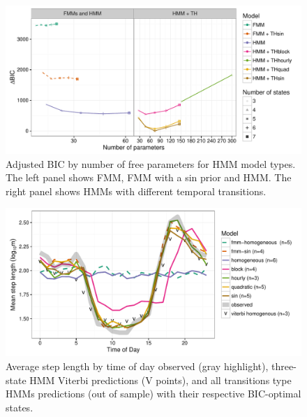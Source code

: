 \documentclass{article}\usepackage[]{graphicx}\usepackage{xcolor}
\makeatletter
\def\maxwidth{ %
  \ifdim\Gin@nat@width>\linewidth
    \linewidth
  \else
    \Gin@nat@width
  \fi
}
\newenvironment{knitrout}{}{} %
\makeatother
\begin{document}
\clearpage

\begin{knitrout}
\color{fgcolor}\begin{figure}
\includegraphics[width=\maxwidth]{figure/adj_BIC_comparisons-1} \caption[Adjusted BIC by number of free parameters for HMM model types]{Adjusted BIC by number of free parameters for HMM model types. The left panel shows FMM, FMM with a sin prior and HMM. The right panel shows HMMs with different temporal transitions.}\label{fig:adj_BIC_comparisons}
\end{figure}


\end{knitrout}

\clearpage

\begin{knitrout}
\color{fgcolor}\begin{figure}
\includegraphics[width=\maxwidth]{figure/avg_step_length_by_time-1} \caption[Average step length by time of day observed (gray highlight), three-state HMM Viterbi predictions (V points), and all transitions type HMMs predictions (out of sample) with their respective BIC-optimal states]{Average step length by time of day observed (gray highlight), three-state HMM Viterbi predictions (V points), and all transitions type HMMs predictions (out of sample) with their respective BIC-optimal states.}\label{fig:avg_step_length_by_time}
\end{figure}


\end{knitrout}
\end{document}
